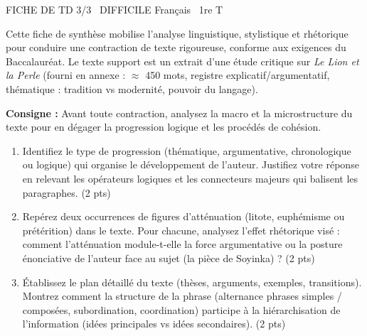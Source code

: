 \documentclass[11pt]{article}
\begin{document}
\begin{tcolorbox}[enhanced,colback=popink,colframe=popink,arc=10pt,boxrule=0pt,left=12pt,right=12pt,top=9pt,bottom=9pt]
{\color{white}\popxbold\small FICHE DE TD 3/3 \textbullet\ DIFFICILE \hfill Français \textbullet\ 1re T\par}
\end{tcolorbox}
\vspace{4pt}
\noindent Cette fiche de synthèse mobilise l'analyse linguistique, stylistique et rhétorique pour conduire une contraction de texte rigoureuse, conforme aux exigences du Baccalauréat. Le texte support est un extrait d'une étude critique sur \textit{Le Lion et la Perle} (fourni en annexe : $\approx$ 450 mots, registre explicatif/argumentatif, thématique : tradition vs modernité, pouvoir du langage).

\begin{exercice}
\textbf{Consigne :} Avant toute contraction, analysez la macro et la microstructure du texte pour en dégager la progression logique et les procédés de cohésion.
\begin{enumerate}
    \item Identifiez le type de progression (thématique, argumentative, chronologique ou logique) qui organise le développement de l'auteur. Justifiez votre réponse en relevant les opérateurs logiques et les connecteurs majeurs qui balisent les paragraphes. (2 pts)
    \item Repérez deux occurrences de figures d'atténuation (litote, euphémisme ou prétérition) dans le texte. Pour chacune, analysez l'effet rhétorique visé : comment l'atténuation module-t-elle la force argumentative ou la posture énonciative de l'auteur face au sujet (la pièce de Soyinka) ? (2 pts)
    \item Établissez le plan détaillé du texte (thèses, arguments, exemples, transitions). Montrez comment la structure de la phrase (alternance phrases simples / composées, subordination, coordination) participe à la hiérarchisation de l'information (idées principales vs idées secondaires). (2 pts)
\end{enumerate}
\end{exercice}
\end{document}
